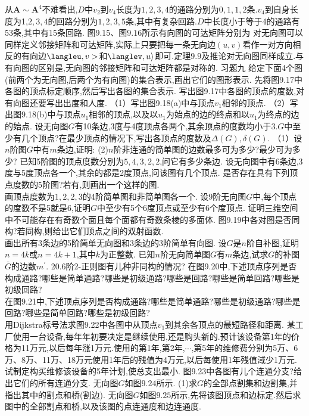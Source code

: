 从$\boldsymbol{A}\sim\boldsymbol{A}^{4}$不难看出,$D$中$v_{2}$到$v_{4}$长度为$1,2,3,4$的通路分别为$0,1,1,2$条.$v_{4}$到自身长度为1,$2,3,4$的回路分别为$1,2,3,5$条,其中有复杂回路.$D$中长度小于等于4的通路有53条,其中有15条回路.
图9.15、图$9.16$所示有向图的可达矩阵分别为
对无向图可以同样定义邻接矩阵和可达矩阵,实际上只要把每一条无向边$(u,v)$看作一对方向相反的有向边$\langleu,v>$和$\langlev,u\rangle$即可.定理$9.9$及推论对无向图同样成立.与有向图的区别是,无向图的邻接矩阵和可达矩阵都是对称的.
{$习$题九}
给定下面4个图(前两个为无向图,后两个为有向图)的集合表示,画出它们的图形表示.
先将图9.17中各图的顶点标定顺序,然后写出各图的集合表示.
写出图9.17中各图的顶点的度数,对有向图还要写出出度和人度.
（1）写出图9.18(a)中与顶点$v_{1}$相邻的顶点.
（2）写出图9.18(b)中与顶点$u_{1}$相邻的顶点,以及以$u_{1}$为始点的边的终点和以$u_{1}$为终点的边的始点.
设无向图$G$有10条边,3度与4度顶点各两个,其余顶点的度数均小于$3.G$中至少有几个顶点?在最少顶点的情况下,写出各顶点的度数及$\Delta(G),\delta(G)$.
（1）设$n$阶图$G$中有$m$条边,证明:
(2)$n$阶非连通的简单图的边数最多可为多少?最少可为多少?
已知5阶图的顶点度数分别为$5,4,3,2,2$,问它有多少条边.
设无向图中有6条边,3度与5度顶点各一个,其余的都是2度顶点,问该图有几个顶点.
是否存在具有下列顶点度数的5阶图?若有,则画出一个这样的图.\\
画顶点度数为$1,2,2,3$的4阶简单图和非简单图各一个.
设9阶无向图$G$中,每个顶点的度数不是5就是6,证明$G$中至少有5个6度顶点或至少有6个度顶点.
证明三维空间中不可能存在有奇数个面且每个面都有奇数条棱的多面体.
图9.19中各对图是否同构?若同构,则给出它们顶点之间的双射函数.\\
画出所有3条边的5阶简单无向图和3条边的3阶简单有向图.
设$G$是$n$阶自补图,证明$n=4k$或$n=4k+1$,其中$k$为正整数.
已知$n$阶无向简单图$G$有$m$条边,试求$G$的补图$\bar{G}$的边数$m^{\prime}$.
20.6阶2-正则图有儿种非同构的情况?
在图9.20中,下述顶点序列是否构成通路?哪些是简单通路?哪些是初级通路?哪些是回路?哪些是简单回路?哪些是初级回路?\\
在图9.21中,下述顶点序列是否构成通路?哪些是简单通路?哪些是初级通路?哪些是回路?哪些是简单回路?哪些是初级回路?\\
用Dijkstra标号法求图9.22中各图中从顶点$v_{1}$到其余各顶点的最短路径和距离.
某工厂使用一台设备,每年年初要决定是继续使用,还是购头新的.预计该设备第1年的价格为11万元,以后每年涨1万元.使用的第1年,第2年,$\cdots$,第5年的维修费分别为5万、6万、8万、11万、18万元使用1年后的残值为4万元,以后每使用1年残值淢少1万元.试制定构买维修该设备的5年计划,使总支出最小.
图9.23中各图有儿个连通分支?给出它们的所有连通分支.
无向图$G$如图$9.24$所示.
(1)求$G$的全部点割集和边割集,并指出其中的割点和桥(割边).
无向图$G$如图$9.25$所示,先将该图顶点和边标定.然后求图中的全部割点和桥,以及该图的点连通度和边连通度.
